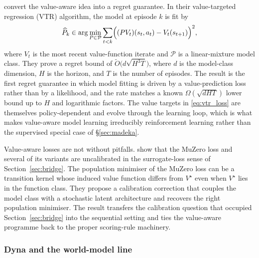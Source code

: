 \citet{AyoubVTR2020} convert the value-aware idea into a regret
guarantee. In their value-targeted regression (VTR) algorithm, the model
at episode $k$ is fit by
\begin{equation}
\widehat P_k \in \arg\min_{P \in \mathcal P}
\sum_{t < k} \Bigl(
  (P V_t)(s_t, a_t) - V_t(s_{t+1})
\Bigr)^2,
\label{eq:vtr_loss}
\end{equation}
where $V_t$ is the most recent value-function iterate and $\mathcal P$ is
a linear-mixture model class. They prove a regret bound of
$\widetilde O\bigl(d \sqrt{H^3 T}\bigr)$, where $d$ is the model-class
dimension, $H$ is the horizon, and $T$ is the number of episodes. The
result is the first regret guarantee in which model fitting is driven by
a value-prediction loss rather than by a likelihood, and the rate matches
a known $\Omega(\sqrt{d H T})$ lower bound up to $H$ and logarithmic
factors. The value targets in \eqref{eq:vtr_loss} are themselves
policy-dependent and evolve through the learning loop, which is what
makes value-aware model learning irreducibly reinforcement learning
rather than the supervised special case of \S\ref{sec:madeka}.

Value-aware losses are not without pitfalls. \citet{VoelckerCalib2025}
show that the MuZero loss and several of its variants are uncalibrated in
the surrogate-loss sense of Section~\ref{sec:bridge}. The population
minimiser of the MuZero loss can be a transition kernel whose induced
value function differs from $V^\star$ even when $V^\star$ lies in the
function class. They propose a calibration correction that couples the
model class with a stochastic latent architecture and recovers the right
population minimiser. The result transfers the calibration question that
occupied Section~\ref{sec:bridge} into the sequential setting and ties the
value-aware programme back to the proper scoring-rule machinery.

\subsubsection{Dyna and the world-model line}
\label{sec:world_models}

